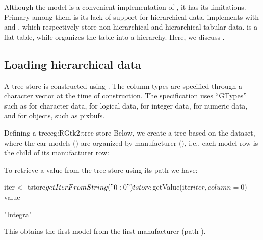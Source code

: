 Although the  model is a convenient implementation
of , it has its limitations. Primary among them is
its lack of support for hierarchical data. \GTK\/ implements
 with  and
, which respectively store non-hierarchical and
hierarchical tabular data.  is a flat table,
while  organizes the table into a hierarchy. Here,
we discuss .

\subsection{Loading hierarchical data}
  

A tree store is constructed using . The
column types are specified through a character vector at the time of
construction. The specification uses ``GTypes'' such as
 for character data,  for logical
data,  for integer data,  for numeric data,
and  for \GTK\/ objects, such as pixbufs.

\begin{example}{Defining a tree}{eg:RGtk2:tree-store}
  Below, we create a tree based on the  dataset, where
  the car models () are organized by manufacturer
  (), i.e., each model row is the child of its
  manufacturer row:
\begin{Schunk}
\end{Schunk}
  To retrieve a value from the tree store using its path we have:
\begin{Schunk}
\begin{Sinput}
 iter <- tstore$getIterFromString("0:0")
 tstore$getValue(iter$iter, column = 0)$value
\end{Sinput}
\begin{Soutput}
[1] "Integra"
\end{Soutput}
\end{Schunk}
This obtains the first model from the first manufacturer (path ).
\end{example}



